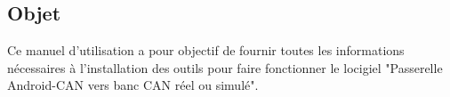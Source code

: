 \subsection{Objet} %
Ce manuel d'utilisation a pour objectif de fournir toutes les informations nécessaires à l'installation des outils pour faire fonctionner le locigiel "Passerelle Android-CAN vers banc CAN réel ou simulé". 
\medskip